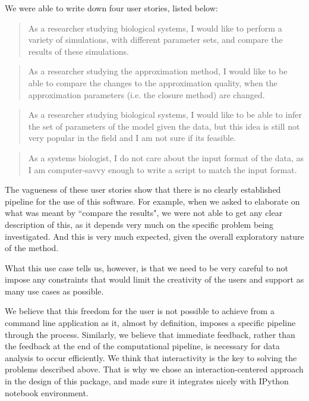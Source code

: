 We were able to write down four user stories, listed below:

\blockquote{As a researcher studying biological systems, I would like to perform a variety of simulations, with different parameter sets, and compare the results of these simulations.}

\blockquote{As a researcher studying the approximation method, I would like to be able to compare the changes to the approximation quality, when the approximation parameters (i.e. the closure method) are changed.}

\blockquote{As a researcher studying biological systems, I would like to be able to infer the set of parameters of the model given the data, but this idea is still not very popular in the field and I am not sure if its feasible.}

\blockquote{As a systems biologist, I do not care about the input format of the data, as I am computer-savvy enough to write a script to match the input format.}

The vagueness of these user stories show that there is no clearly established pipeline for the use of this software. 
For example, when we asked to elaborate on  what was meant by ``compare the results", we were not able to get any clear description of this, as it depends very much on the specific problem being investigated.
And this is very much expected, given the overall exploratory nature of the method. 

What this use case tells us, however, is that we need to be very careful to not impose any constraints that would limit the creativity of the users and support as many use cases as possible.

We believe that this freedom for the user is not possible to achieve from a command line application as it, almost by definition, imposes a specific pipeline through the process. Similarly, we believe that immediate feedback, rather than the feedback at the end of the computational pipeline, is necessary for data analysis to occur efficiently. 
We think that interactivity is the key to solving the problems described above.
That is why we chose an interaction-centered approach in the design of this package, and made sure it integrates nicely with 
 IPython notebook environment.
